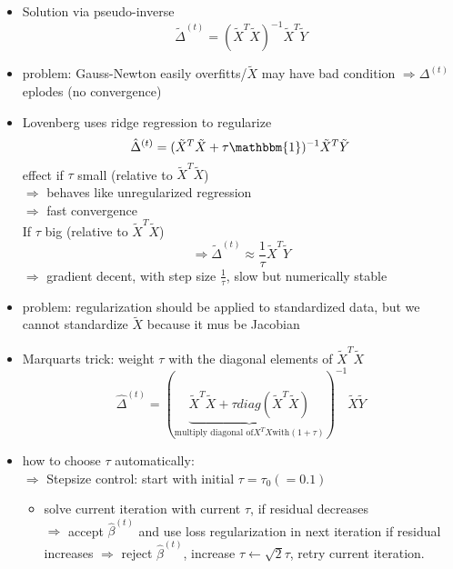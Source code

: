 \documentclass[11pt]{article}
\begin{document}
    \begin{itemize}
      \item Solution via pseudo-inverse
      \begin{equation*}
        \tilde{\Delta}^{(t)}=(\tilde{X}^T\tilde{X})^{-1}\tilde{X}^T\tilde{Y}
      \end{equation*}
      \item problem: Gauss-Newton easily overfitts/$\tilde{X}$ may have bad condition
      $\Rightarrow \Delta^{(t)}$ eplodes (no convergence)
      \item Lovenberg uses ridge regression to regularize
      \begin{equation*}
        \hat{\Delta}^{(t)}=(\tilde{X}^T\tilde{X}+\tau \mathbbm{1})^{-1}\tilde{X}^T\tilde{Y}
      \end{equation*}
      effect if $\tau$ small (relative to $\tilde{X}^T\tilde{X}$) \\
      $\Rightarrow$ behaves like unregularized regression \\
      $\Rightarrow$ fast convergence \\
      If $\tau$ big (relative to $\tilde{X}^T\tilde{X}$)
      \begin{equation*}
        \Rightarrow \tilde{\Delta}^{(t)} \approx \frac{1}{\tau} \tilde{X}^T\tilde{Y}
      \end{equation*}
      $\Rightarrow$ gradient decent, with step size $\frac{1}{\tau}$, slow but numerically stable
      \item problem: regularization should be applied to standardized data, but we cannot standardize $\tilde{X}$ because it mus be Jacobian
      \item Marquarts trick: weight $\tau$ with the diagonal elements of $\tilde{X}^T\tilde{X}$
      \begin{equation*}
      \hat{\Delta}^{(t)} = (\underbrace{\tilde{X}^T\tilde{X} + \tau diag(\tilde{X}^T\tilde{X})}_{\text{multiply diagonal of} X^TX \text{with} (1+\tau)})^{-1}\tilde{X}\tilde{Y}
      \end{equation*}
      \item how to choose $\tau$ automatically: \\
      $\Rightarrow$ Stepsize control: start with initial $\tau = \tau_{0} (=0.1)$
      \begin{itemize}
      \item solve current iteration with current $\tau$, if residual decreases \\
      $\Rightarrow$ accept $\hat{\beta}^{(t)}$ and use loss regularization in next iteration if residual increases $\Rightarrow$ reject $\hat{\beta}^{(t)}$, increase $\tau \leftarrow \sqrt{2} \tau$, retry current iteration.
      \end{itemize}

    \end{itemize}
\end{document}
